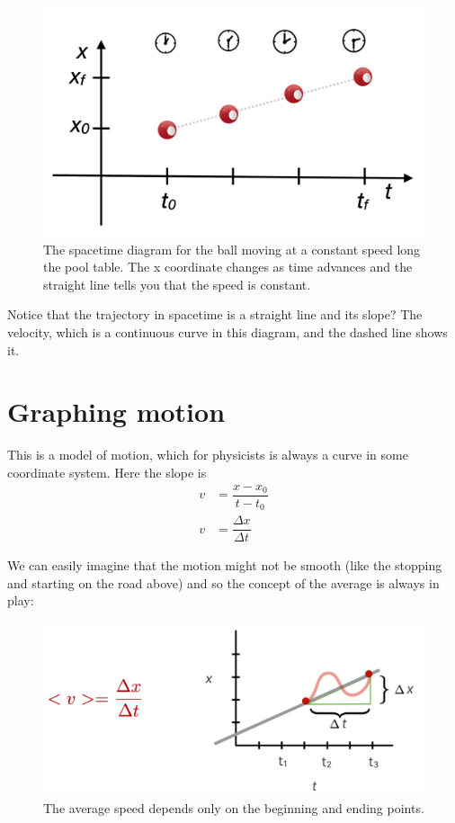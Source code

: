 \documentclass[
  letterpaper,
  DIV=11,
  numbers=noendperiod,
  oneside]{scrreprt}
\begin{document}
\begin{figure}[H]

{\centering \includegraphics[width=0.8\linewidth,height=\textheight,keepaspectratio]{mechanics/motion/screenshot_3666.png}

}

\caption{The spacetime diagram for the ball moving at a constant speed
long the pool table. The x coordinate changes as time advances and the
straight line tells you that the speed is constant.}

\end{figure}%

Notice that the trajectory in spacetime is a straight line and its
slope? The velocity, which is a continuous curve in this diagram, and
the dashed line shows it.

\section{Graphing motion}\label{graphing-motion}

This is a model of motion, which for physicists is always a curve in
some coordinate system. Here the slope is \[
\begin{align}
v &=\dfrac{x-x_0}{t-t_0} \nonumber \\
v &= \dfrac{\Delta x}{\Delta t} \nonumber
\end{align}
\]

We can easily imagine that the motion might not be smooth (like the
stopping and starting on the road above) and so the concept of the
average is always in play:

\begin{figure}[H]

{\centering \includegraphics[width=0.8\linewidth,height=\textheight,keepaspectratio]{mechanics/motion/screenshot_3667.png}

}

\caption{The average speed depends only on the beginning and ending
points.}

\end{figure}%
\end{document}
